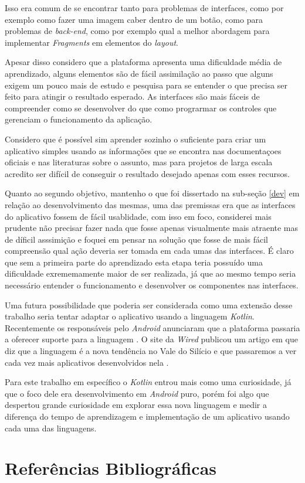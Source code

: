 \documentclass[hidelinks,12pt]{article}
\begin{document}
Isso era comum de se encontrar tanto para problemas de interfaces, como por exemplo como fazer uma imagem caber dentro de um bot\~ao, como para problemas de \textit{back-end}, como por exemplo qual a melhor abordagem para implementar \textit{Fragments} em elementos do \textit{layout}.

Apesar disso considero que a plataforma apresenta uma dificuldade m\'edia de aprendizado, alguns elementos s\~ao de f\'acil assimila\c{c}\~ao ao passo que alguns exigem um pouco mais de estudo e pesquisa para se entender o que precisa ser feito para atingir o resultado esperado. As interfaces s\~ao mais f\'aceis de compreender como se desenvolver do que como prograrmar os controles que gerenciam o funcionamento da aplica\c{c}\~ao.

Considero que \'e poss\'ivel sim aprender sozinho o suficiente para criar um aplicativo simples usando as informa\c{c}\~oes que se encontra nas documenta\c{c}oes oficiais e nas literaturas sobre o assunto, mas para projetos de larga escala acredito ser dif\'icil de conseguir o resultado desejado apenas com esses recursos.

Quanto ao segundo objetivo, mantenho o que foi dissertado na sub-se\c{c}\~ao \ref{dev} em rela\c{c}\~ao ao desenvolvimento das mesmas, uma das premissas era que as interfaces do aplicativo fossem de f\'acil usablidade, com isso em foco, considerei mais prudente n\~ao precisar fazer nada que fosse apenas visualmente mais atraente mas de d\'ificil asssimi\c{c}\~ao e foquei em pensar na solu\c{c}\~ao que fosse de mais f\'acil compreens\~ao qual a\c{c}\~ao deveria ser tomada em cada umas das interfaces. É claro que sem a primeira parte do aprendizado esta etapa teria possu\'ido uma dificuldade exrememamente maior de ser realizada, j\'a que ao mesmo tempo seria necess\'ario entender o funcionamento e desenvolver os componentes nas interfaces.

Uma futura possibilidade que poderia ser considerada como uma extens\~ao desse trabalho seria tentar adaptar o aplicativo usando a linguagem \textit{Kotlin}. Recentemente os respons\'aveis pelo \textit{Android} anunciaram que a plataforma passaria a oferecer suporte para a linguagem \cite{kotlin:and_adopt}. O site da \textit{Wired} publicou um artigo em que diz que a linguagem \'e a nova tendência no Vale do Sil\'icio e que passaremos a ver cada vez mais aplicativos desenvolvidos nela \cite{kotlin:wired}.

Para este trabalho em espec\'ifico o \textit{Kotlin} entrou mais como uma curiosidade, j\'a que o foco dele era desenvolvimento em \textit{Android} puro, por\'em foi algo que despertou grande curiosidade em explorar essa nova linguagem e medir a diferen\c{c}a do tempo de aprendizagem e implementa\c{c}\~ao de um aplicativo usando cada uma das linguagens.
\newpage
\section*{Refer\^encias Bibliogr\'aficas}
\renewcommand\refname{}


\end{document}
